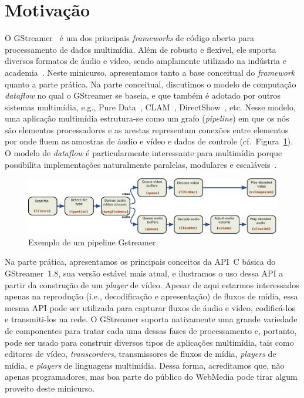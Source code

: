 \documentclass{SBCbookchapter}
\begin{document}

\section{Motivação}

O GStreamer~\cite{gstreamer} é um dos principais \emph{frameworks} de código
aberto para processamento de dados multimídia.  Além de robusto e flexível,
ele suporta diversos formatos de áudio e vídeo, sendo amplamente utilizado
na indústria e academia~\cite{gstreamer-apps}.  Neste minicurso,
apresentamos tanto a base conceitual do \emph{framework} quanto a parte
prática.  Na parte conceitual, discutimos o modelo de computação
\emph{dataflow} no qual o GStreamer se baseia, e que também é adotado por
outros sistemas multimídia, e.g., Pure Data~\cite{Puckette-M-S-2007},
CLAM~\cite{Amatriain-X-2008}, DirectShow~\cite{Chatterjee-A-1997}, etc.
Nesse modelo, uma aplicação multimídia estrutura-se como um grafo
(\emph{pipeline}) em que os nós são elementos processadores e as arestas
representam conexões entre elementos por onde fluem as amostras de áudio e
vídeo e dados de controle (cf.~Figura~\ref{fig:pipeline}).  O modelo de
\emph{dataflow} é particularmente interessante para multimídia porque
possibilita implementações naturalmente paralelas, modulares e
escaláveis~\cite{Yviquel-H-2014}.

\begin{figure}[ht!]
  \label{fig:pipeline}
  \includegraphics[width=\textwidth]{gstreamer_pipeline.pdf}
  \caption{Exemplo de um pipeline Gstreamer.}
\end{figure}

Na parte prática, apresentamos os principais conceitos da API~C básica do
GStreamer~1.8, sua versão estável mais atual, e ilustramos o uso dessa API a
partir da construção de um \emph{player} de vídeo.  Apesar de aqui estarmos
interessados apenas na reprodução (i.e., decodificação e apresentação) de
fluxos de mídia, essa mesma API pode ser utilizada para capturar fluxos de
áudio e vídeo, codificá-los e transmiti-los na rede.  O GStreamer suporta
nativamente uma grande variedade de componentes para tratar cada uma dessas
fases de processamento e, portanto, pode ser usado para construir diversos
tipos de aplicações multimídia, tais como editores de vídeo,
\emph{transcorders}, transmissores de fluxos de mídia, \emph{players} de
mídia, e \emph{players} de linguagens multimídia.  Dessa forma, acreditamos
que, não apenas programadores, mas boa parte do público do WebMedia pode
tirar algum proveito deste minicurso.
\end{document}

